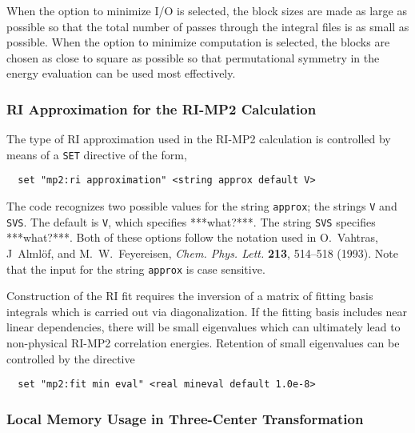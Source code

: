When the option to minimize I/O is selected, the block sizes are made
as large as possible so that the total number of passes
through the integral files is as small as possible.  When the option to
minimize computation is selected, the blocks are chosen as close to square as
possible so that permutational symmetry in the energy evaluation can
be used most effectively.

\subsubsection{RI Approximation for the RI-MP2 Calculation}

The type of RI approximation used in the RI-MP2 calculation is controlled
by means of a \verb+SET+ directive of the form,

\begin{verbatim}
  set "mp2:ri approximation" <string approx default V>
\end{verbatim}


The code recognizes two possible values for the string \verb+approx+;
the strings \verb+V+ and \verb+SVS+.  The default is \verb+V+, which 
specifies ***what?***.  The string \verb+SVS+ specifies ***what?***.
Both of these options follow the notation used in O.~Vahtras, J~Alml\"of,
and M.~W.~Feyereisen, {\em Chem. Phys. Lett.} {\bf 213}, 514--518
(1993).  Note that the input for the string \verb+approx+ is case sensitive.

Construction of the RI fit requires the inversion of a matrix of
fitting basis integrals which is carried out via diagonalization.  If
the fitting basis includes near linear dependencies, there will be
small eigenvalues which can ultimately lead to non-physical RI-MP2
correlation energies.  Retention of small eigenvalues can be
controlled by the directive

\begin{verbatim}
  set "mp2:fit min eval" <real mineval default 1.0e-8>
\end{verbatim}


\subsubsection{Local Memory Usage in Three-Center Transformation}

